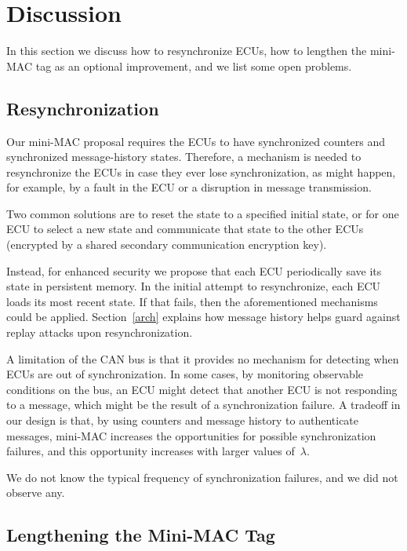 \section{Discussion}
\label{discuss}

In this section we discuss how to resynchronize ECUs, 
how to lengthen the mini-MAC tag as an optional improvement, 
and we list some open problems.


\subsection{Resynchronization}
\label{resynch}

Our mini-MAC proposal requires the ECUs to have synchronized counters and synchronized message-history states.
Therefore, a mechanism is needed to resynchronize the ECUs in case they ever lose synchronization,
as might happen, for example, by a fault in the ECU or a disruption in message transmission.

Two common solutions are to reset the state to a specified initial state, or for one ECU to select
a new state and communicate that state to the other ECUs (encrypted by a shared secondary communication
encryption key).  

Instead, for enhanced security we propose that each ECU periodically save its state in persistent memory.  
In the initial attempt to resynchronize, each ECU loads its most recent state.  If that fails, then the aforementioned
mechanisms could be applied.  Section~\ref{arch} explains how message history helps guard against
replay attacks upon resynchronization.

A limitation of the CAN bus is that it provides no mechanism for detecting when ECUs are out
of synchronization.  In some cases, by monitoring observable conditions on the bus, 
an ECU might detect that another ECU is not responding to a message, which might be
the result of a synchronization failure.  A tradeoff in our design is that, by using
counters and message history to authenticate messages, 
mini-MAC increases the opportunities for possible synchronization failures,
and this opportunity increases with larger values of~$\lambda$.

We do not know the typical frequency of synchronization failures,
and we did not observe any.

\subsection{Lengthening the Mini-MAC Tag}
\label{addingbits}

